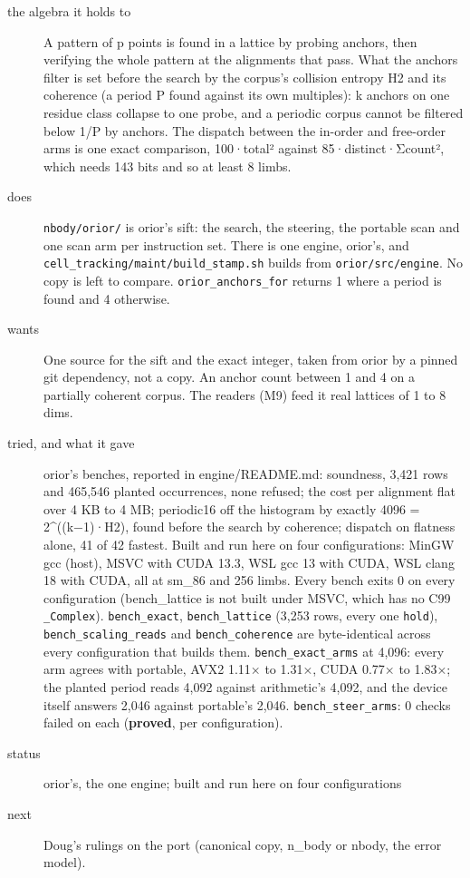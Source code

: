 \begin{description}
\item[{the algebra it holds to}] A pattern of p points is found in a lattice by probing anchors, then verifying the whole pattern at the alignments that pass. What the anchors filter is set before the search by the corpus's collision entropy H2 and its coherence (a period P found against its own multiples): k anchors on one residue class collapse to one probe, and a periodic corpus cannot be filtered below 1/P by anchors. The dispatch between the in-order and free-order arms is one exact comparison, 100·total² against 85·distinct·Σcount², which needs 143 bits and so at least 8 limbs.
\item[{does}] \texttt{nbody/\allowbreak{}orior/\allowbreak{}} is orior's sift: the search, the steering, the portable scan and one scan arm per instruction set. There is one engine, orior's, and \texttt{cell\_\allowbreak{}tracking/\allowbreak{}maint/\allowbreak{}build\_\allowbreak{}stamp.\allowbreak{}sh} builds from \texttt{orior/\allowbreak{}src/\allowbreak{}engine}. No copy is left to compare. \texttt{orior\_\allowbreak{}anchors\_\allowbreak{}for} returns 1 where a period is found and 4 otherwise.
\item[{wants}] One source for the sift and the exact integer, taken from orior by a pinned git dependency, not a copy. An anchor count between 1 and 4 on a partially coherent corpus. The readers (M9) feed it real lattices of 1 to 8 dims.
\item[{tried, and what it gave}] orior's benches, reported in engine/README.md: soundness, 3,421 rows and 465,546 planted occurrences, none refused; the cost per alignment flat over 4 KB to 4 MB; periodic16 off the histogram by exactly 4096 = 2\textasciicircum{}((k−1)·H2), found before the search by coherence; dispatch on flatness alone, 41 of 42 fastest. Built and run here on four configurations: MinGW gcc (host), MSVC with CUDA 13.3, WSL gcc 13 with CUDA, WSL clang 18 with CUDA, all at sm\_\allowbreak{}86 and 256 limbs. Every bench exits 0 on every configuration (bench\_\allowbreak{}lattice is not built under MSVC, which has no C99 \texttt{\_\allowbreak{}Complex}). \texttt{bench\_\allowbreak{}exact}, \texttt{bench\_\allowbreak{}lattice} (3,253 rows, every one \texttt{hold}), \texttt{bench\_\allowbreak{}scaling\_\allowbreak{}reads} and \texttt{bench\_\allowbreak{}coherence} are byte-identical across every configuration that builds them. \texttt{bench\_\allowbreak{}exact\_\allowbreak{}arms} at 4,096: every arm agrees with portable, AVX2 1.11× to 1.31×, CUDA 0.77× to 1.83×; the planted period reads 4,092 against arithmetic's 4,092, and the device itself answers 2,046 against portable's 2,046. \texttt{bench\_\allowbreak{}steer\_\allowbreak{}arms}: 0 checks failed on each (\textbf{proved}, per configuration).
\item[{status}] orior's, the one engine; built and run here on four configurations
\item[{next}] Doug's rulings on the port (canonical copy, n\_\allowbreak{}body or nbody, the error model).
\end{description}

